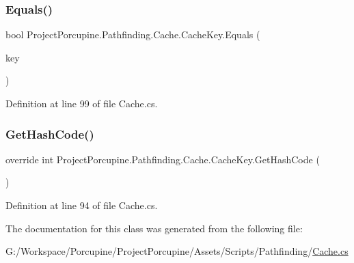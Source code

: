 \subsubsection{\texorpdfstring{Equals()}{Equals()}}
{\footnotesize\ttfamily bool Project\+Porcupine.\+Pathfinding.\+Cache.\+Cache\+Key.\+Equals (\begin{DoxyParamCaption}\item[{\hyperlink{class_project_porcupine_1_1_pathfinding_1_1_cache_1_1_cache_key}{Cache\+Key}}]{key }\end{DoxyParamCaption})}



Definition at line 99 of file Cache.\+cs.

\mbox{\label{class_project_porcupine_1_1_pathfinding_1_1_cache_1_1_cache_key_a19c1083399bdce49ceadc64a7d3c6420}} 
\subsubsection{\texorpdfstring{Get\+Hash\+Code()}{GetHashCode()}}
{\footnotesize\ttfamily override int Project\+Porcupine.\+Pathfinding.\+Cache.\+Cache\+Key.\+Get\+Hash\+Code (\begin{DoxyParamCaption}{ }\end{DoxyParamCaption})}



Definition at line 94 of file Cache.\+cs.



The documentation for this class was generated from the following file\+:\begin{DoxyCompactItemize}
\item 
G\+:/\+Workspace/\+Porcupine/\+Project\+Porcupine/\+Assets/\+Scripts/\+Pathfinding/\hyperlink{_cache_8cs}{Cache.\+cs}\end{DoxyCompactItemize}

